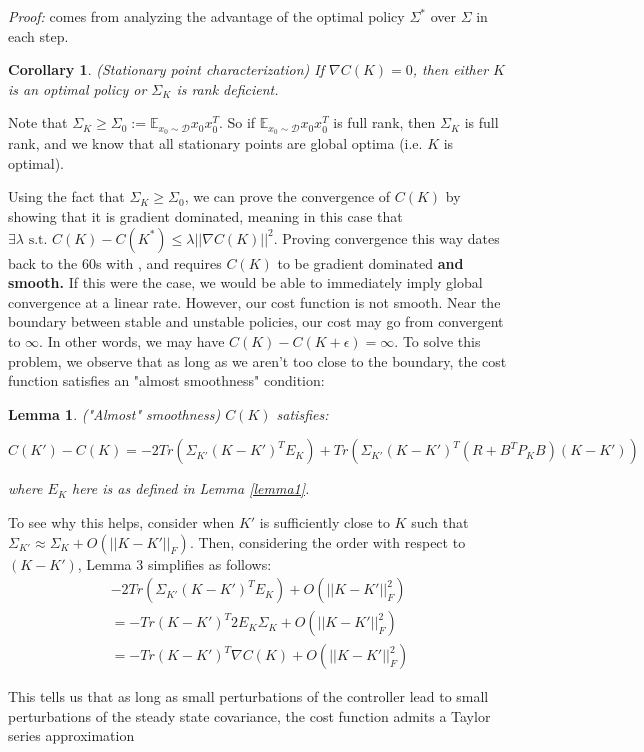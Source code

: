 \documentclass{article}[12pt]
\newtheorem{corollary}{Corollary}
\newtheorem{lemma}{Lemma}
\def\E{\mathbb{E}}
\def \E{\mathbb E}
\begin{document}
\textit{Proof:} comes from analyzing the advantage of the optimal policy $\Sigma^*$ over $\Sigma$ in each step. 

\begin{corollary} (Stationary point characterization)
If $\nabla C(K) = 0$, then either $K$ is an optimal policy or $\Sigma_K$ is rank deficient.
\end{corollary}
Note that $\Sigma_K \geq \Sigma_0 := \E_{x_0 \sim \mathcal{D}}x_0x_0^T$. So if $ \E_{x_0 \sim \mathcal{D}}x_0x_0^T$ is full rank, then $\Sigma_K$ is full rank, and we know that all stationary points are global optima (i.e. $K$ is optimal).

Using the fact that $\Sigma_K \geq \Sigma_0$, we can prove the convergence of $C(K)$ by showing that it is gradient dominated, meaning in this case that $\exists \lambda \text{ s.t. } C(K)-C(K^*) \leq \lambda ||\nabla C(K)||^2$. Proving convergence this way dates back to the 60s with \cite{Polyak1963}, and requires $C(K)$ to be gradient dominated \textbf{and smooth.} If this were the case, we would be able to immediately imply global convergence at a linear rate. However, our cost function is not smooth. Near the boundary between stable and unstable policies, our cost may go from convergent to $\infty$. In other words, we may have $C(K)-C(K+\epsilon) = \infty$. To solve this problem, we observe that as long as we aren't too close to the boundary, the cost function satisfies an "almost smoothness" condition:

\begin{lemma} ("Almost" smoothness) $C(K)$ satisfies:
\label{almostsmoothness}

$$C(K') - C(K) = -2Tr(\Sigma_{K'}(K-K')^TE_K) + Tr(\Sigma_{K'}(K-K')^T(R+B^TP_KB)(K-K'))$$

where $E_K$ here is as defined in Lemma \ref{lemma1}.

\end{lemma}

To see why this helps, consider when $K'$ is sufficiently close to $K$ such that $\Sigma_{K'}\approx \Sigma_K + O(||K-K'||_F)$. Then, considering the order with respect to $(K-K')$, Lemma 3 simplifies as follows:
\begin{align*}
-2Tr(\Sigma_{K'}(K-K')^TE_K) + O(||K-K'||_F^2)\\
= -Tr(K-K')^T2E_K\Sigma_K + O(||K-K'||_F^2)\\
= -Tr(K-K')^T\nabla C(K) + O(||K-K'||_F^2)
\end{align*}

This tells us that as long as small perturbations of the controller lead to small perturbations of the steady state covariance, the cost function admits a Taylor series approximation
\end{document}
